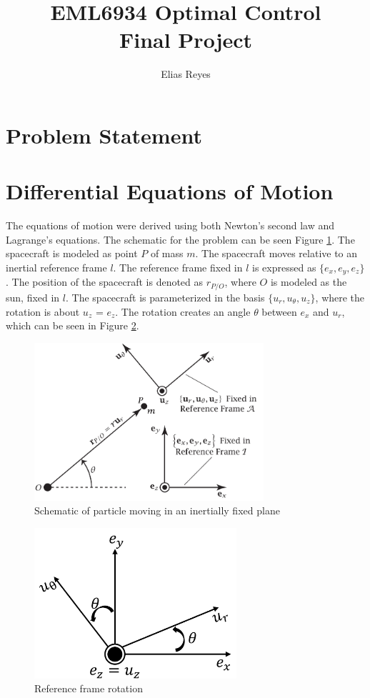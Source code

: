 \documentclass[]{article}
\title{EML6934 Optimal Control \\ Final Project}
\author{Elias Reyes}
\begin{document}
	
	\maketitle
	\thispagestyle{empty}
	\newpage
	\newpage
	\tableofcontents
	\newpage
	\listoffigures
	\listoftables
	\newpage
	\lstlistoflistings
	\newpage
	
	\section{Problem Statement}
	\section{Differential Equations of Motion}
	The equations of motion were derived using both Newton's second law and Lagrange's equations. The schematic for the problem can be seen Figure \ref{fig:schematic}. The spacecraft is modeled as point \(P\) of  mass \(m\). The spacecraft moves relative to an inertial reference frame \(l\). The reference frame fixed in \(l\) is expressed as \(\{e_{x},e_{y},e_{z}\}\). The position of the spacecraft is denoted as \(r_{P/O}\), where \(O\) is modeled as the sun, fixed in \(l\). The spacecraft is parameterized in the basis \(\{u_{r},u_{\theta},u_{z}\}\), where the rotation is about \(u_{z}\) = \(e_{z}\). The rotation creates an angle \(\theta\) between \(e_{x}\) and \(u_{r}\), which can be seen in Figure \ref{fig:rotation2}.
	\begin{figure}
		\centering
		\includegraphics[width=85mm,scale=0.85]{midterm_schematic.png}
		\caption{Schematic of particle moving in an inertially fixed plane}
		\label{fig:schematic}
	\end{figure}
	\begin{figure}
		\centering
		\includegraphics[width=75mm,scale=0.75]{rotation.png}
		\caption{Reference frame rotation}
		\label{fig:rotation2}
	\end{figure}
\end{document}
